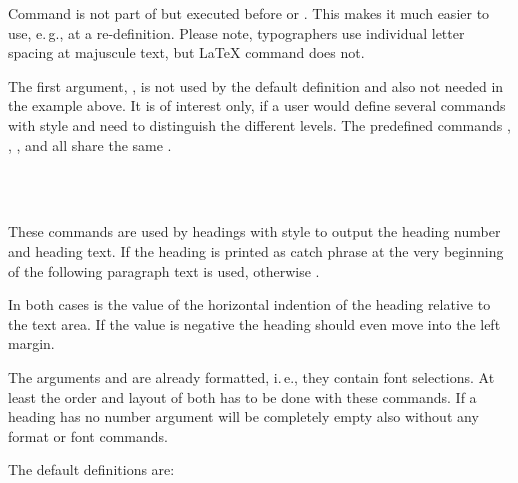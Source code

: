 Command  is not part of  but executed before
 or . This makes
it much easier to use, e.\,g.,  at a
re-definition. Please note, typographers use individual letter spacing at
majuscule text, but \LaTeX{} command  does not.

The first argument, , is not used by the default definition and
also not needed in the example above. It is of interest only, if a user would
define several commands with  style and need to distinguish
the different levels. The predefined commands ,
, , and  all share the same
 .%
%
%


\begin{Declaration}
    \\
    \\
\end{Declaration}
%
%
These commands are used by headings with style 
to output the heading number and heading text. If the heading is printed as
catch phrase at the very beginning of the following paragraph text
 is used, otherwise
.

In both cases  is the value of the horizontal indention of the
heading relative to the text area. If the value is negative the heading should
even move into the left margin.

The arguments  and  are already formatted, i.\,e.,
they contain font selections. At least the order and layout of both has to be
done with these commands. If a heading has no number argument 
will be completely empty also without any format or font commands.

The default definitions are:
\begin{lstcode}[belowskip=\dp\strutbox plus 1pt]
\newcommand{\sectionlinesformat}[4]{%
  \@hangfrom{\hskip #2#3}{#4}%
}
\newcommand{\sectioncatchphraseformat}[4]{%
  \hskip #2#3#4%
}
\end{lstcode}

